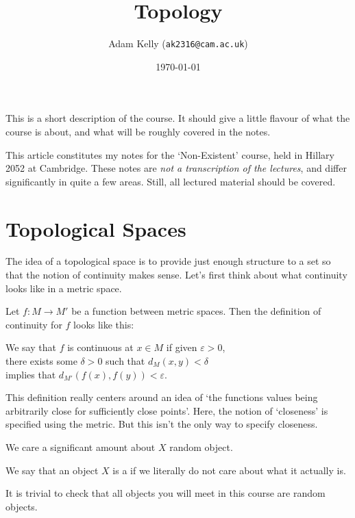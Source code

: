\documentclass[a4paper]{article}
\title{Topology}
\author{Adam Kelly (\texttt{ak2316@cam.ac.uk})}
\date{\today}
\begin{document}
\maketitle

This is a short description of the course. It should give a little flavour of what the course is about, and what will be roughly covered in the notes.

This article constitutes my notes for the `Non-Existent' course, held in Hillary 2052 at Cambridge. These notes are \emph{not a transcription of the lectures}, and differ significantly in quite a few areas. Still, all lectured material should be covered.


\section{Topological Spaces}

The idea of a topological space is to provide just enough structure to a set so that the notion of continuity makes sense. Let's first think about what continuity looks like in a metric space.

Let $f: M \rightarrow M'$ be a function between metric spaces. Then the definition of continuity for $f$ looks like this:

\begin{center}\color{blue}
    We say that $f$ is continuous at $x \in M$ if given $\varepsilon > 0$, \\there exists some $\delta > 0$ such that $d_M(x, y)< \delta$ \\implies that $d_{M'}(f(x), f(y)) < \varepsilon$.
\end{center}

This definition really centers around an idea of `the functions values being arbitrarily close for  sufficiently close points'. Here, the notion of `closeness' is specified using the metric.
But this isn't the only way to specify closeness.


\begin{definition}
    
\end{definition}


We care a significant amount about $X$ random object.

\begin{definition}
    We say that an object $X$ is a  if we literally do not care about what it actually is.
\end{definition}

It is trivial to check that all objects you will meet in this course are random objects.
\end{document}
